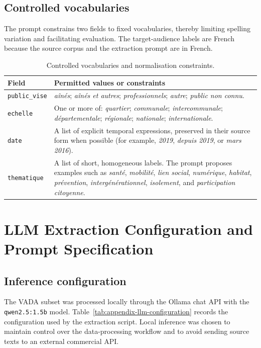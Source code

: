 \section{Controlled vocabularies}

The prompt constrains two fields to fixed vocabularies, thereby limiting
spelling variation and facilitating evaluation. The target-audience labels are
French because the source corpus and the extraction prompt are in French.

\begin{table}[H]
\centering
\begin{tabular}{p{3.6cm}p{10cm}}
\toprule
Field & Permitted values or constraints \\
\midrule
\texttt{public\_vise} & \textit{aînés}; \textit{aînés et autres}; \textit{professionnels}; \textit{autre}; \textit{public non connu}. \\
\texttt{echelle} & One or more of: \textit{quartier}; \textit{communale}; \textit{intercommunale}; \textit{départementale}; \textit{régionale}; \textit{nationale}; \textit{internationale}. \\
\texttt{date} & A list of explicit temporal expressions, preserved in their source form when possible (for example, \textit{2019}, \textit{depuis 2019}, or \textit{mars 2016}). \\
\texttt{thematique} & A list of short, homogeneous labels. The prompt proposes examples such as \textit{santé}, \textit{mobilité}, \textit{lien social}, \textit{numérique}, \textit{habitat}, \textit{prévention}, \textit{intergénérationnel}, \textit{isolement}, and \textit{participation citoyenne}. \\
\bottomrule
\end{tabular}
\caption{Controlled vocabularies and normalisation constraints.}
\label{tab:appendix-vocabularies}
\end{table}

\chapter{LLM Extraction Configuration and Prompt Specification}

\section{Inference configuration}

The VADA subset was processed locally through the Ollama chat API with the
\texttt{qwen2.5:1.5b} model. Table~\ref{tab:appendix-llm-configuration}
records the configuration used by the extraction script. Local inference was
chosen to maintain control over the data-processing workflow and to avoid
sending source texts to an external commercial API.

